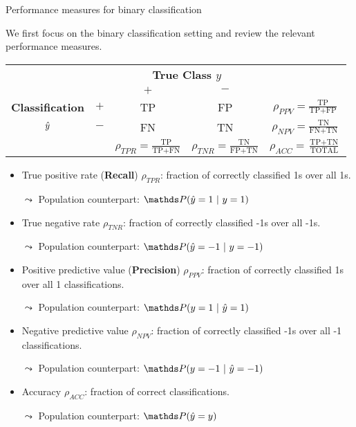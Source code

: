 \begin{vbframe}{Performance measures for binary classification}
%	
\scriptsize{
%	
	We first focus on the binary classification setting and review the relevant performance measures.
%	
	\begin{center}
		\tiny
		\renewcommand{\arraystretch}{1.1}
		\begin{tabular}{cc||cc|c}
			& & \multicolumn{2}{c|}{\bfseries True Class $y$} & \\
			& & $+$ & $-$ & \\ 
			\hline \hline
			\bfseries Classification     & $+$ & TP & FP & $\rho_{PPV} = \frac{\text{TP}}{\text{TP} + \text{FP}}$\\
			$\hat{y}$ & $-$ & FN & TN & $\rho_{NPV} = \frac{\text{TN}}{\text{FN} + \text{TN}}$\\
			\hline
			& & $\rho_{TPR} = \frac{\text{TP}}{\text{TP} + \text{FN}}$ & $\rho_{TNR} = \frac{\text{TN}}{\text{FP} + \text{TN}}$ & $\rho_{ACC} = \frac{\text{TP}+ \text{TN}}{\text{TOTAL}}$
		\end{tabular}
		\renewcommand{\arraystretch}{1}
	\end{center}
%	
	\begin{itemize}
%		
		\item True positive rate (\textbf{Recall}) $\rho_{TPR}$: fraction of correctly classified 1s over all 1s.
%		
		\item [$\leadsto$] Population counterpart: $\P (\yh =1 ~|~ y=1)$
%		
		\item True negative rate $\rho_{TNR}$: fraction of correctly classified -1s over all -1s.
%		
		\item [$\leadsto$] Population counterpart: $\P (\yh = -1 ~|~ y= -1)$
%		
		\item Positive predictive value (\textbf{Precision}) $\rho_{PPV}$: fraction of correctly classified 1s over all 1 classifications.
%		
		\item [$\leadsto$] Population counterpart: $\P (y = 1 ~|~ \yh = 1)$
%		
		\item Negative predictive value $\rho_{NPV}$: fraction of correctly classified -1s over all -1 classifications.
%		
		\item [$\leadsto$] Population counterpart: $\P (y = -1 ~|~ \yh = -1)$
%
		\item Accuracy $\rho_{ACC}$: fraction of correct classifications.
%		
		\item [$\leadsto$] Population counterpart: $\P (\yh = y  )$
	\end{itemize}
}
\end{vbframe}



